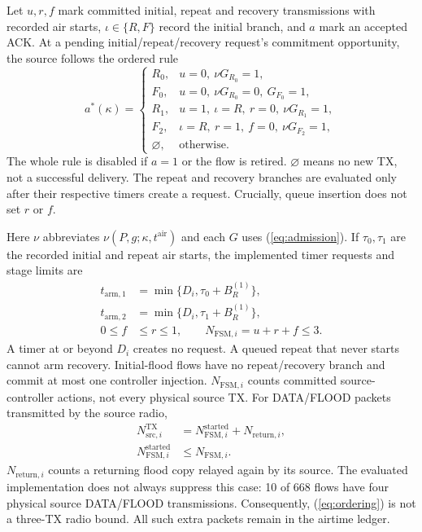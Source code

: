 \documentclass[conference,letterpaper,10pt]{IEEEtran}
\begin{document}
Let $u,r,f$ mark committed initial, repeat and recovery transmissions with
recorded air starts,
$\iota\in\{R,F\}$ record the initial branch, and $a$ mark an accepted ACK.
At a pending initial/repeat/recovery request's commitment opportunity,
the source follows the ordered rule
\begin{equation}
a^*(\kappa)=
\begin{cases}
R_0,&u=0,\ \nu G_{R_0}=1,\\
F_0,&u=0,\ \nu G_{R_0}=0,\ G_{F_0}=1,\\
R_1,&u=1,\ \iota=R,\ r=0,\ \nu G_{R_1}=1,\\
F_2,&\iota=R,\ r=1,\ f=0,\ \nu G_{F_2}=1,\\
\varnothing,&\text{otherwise}.
\end{cases}
\label{eq:cpr-time-guards}
\end{equation}
The whole rule is disabled if $a=1$ or the flow is retired.
$\varnothing$ means no new TX, not a successful delivery.
The repeat and recovery branches are evaluated only after their respective
timers create a request. Crucially, queue insertion does not set $r$ or $f$.

Here $\nu$ abbreviates $\nu(P,g;\kappa,t^{\mathrm{air}})$ and each $G$ uses
(\ref{eq:admission}). If $\tau_0,\tau_1$ are the recorded initial and repeat
air starts, the
implemented timer requests and stage limits are
\begin{equation}
\begin{aligned}
t_{\mathrm{arm},1}&=\min\{D_i,\tau_0+B_R^{(1)}\},\\
t_{\mathrm{arm},2}&=\min\{D_i,\tau_1+B_R^{(1)}\},\\
0\leq f&\leq r\leq1,\qquad N_{\mathrm{FSM},i}=u+r+f\leq3.
\end{aligned}
\label{eq:ordering}
\end{equation}
A timer at or beyond $D_i$ creates no request. A queued repeat that never
starts cannot arm recovery. Initial-flood flows have no repeat/recovery
branch and commit at most one controller injection. $N_{\mathrm{FSM},i}$
counts committed source-controller actions, not every physical source TX.
For DATA/FLOOD packets transmitted by the source radio,
\begin{equation}
\begin{aligned}
N_{\mathrm{src},i}^{\mathrm{TX}}
 &=N_{\mathrm{FSM},i}^{\mathrm{started}}+N_{\mathrm{return},i},\\
N_{\mathrm{FSM},i}^{\mathrm{started}}&\leq N_{\mathrm{FSM},i}.
\end{aligned}
\label{eq:source-radio-accounting}
\end{equation}
$N_{\mathrm{return},i}$ counts a returning flood copy relayed again by its
source. The evaluated implementation does not always suppress this case:
10 of 668 flows have four physical source DATA/FLOOD transmissions.
Consequently, (\ref{eq:ordering}) is not a three-TX radio bound.
All such extra packets remain in the airtime ledger.
\end{document}
